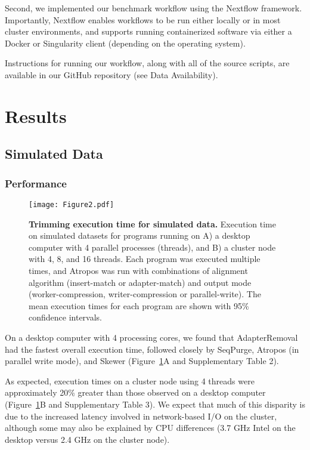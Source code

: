 \documentclass[fleqn,10pt,lineno]{wlpeerj} %
\begin{document}
Second, we implemented our benchmark workflow using the Nextflow \citep{DiTommaso2017Nextflow} framework. Importantly, Nextflow enables workflows to be run either locally or in most cluster environments, and supports running containerized software via either a Docker or Singularity \citep{Kurtzer2016Singularity} client (depending on the operating system).

Instructions for running our workflow, along with all of the source scripts, are available in our GitHub repository (see Data Availability).

\section{Results}\label{results}

\subsection{Simulated Data}

\subsubsection{Performance}

\begin{figure}[!ht]
\centering
\texttt{[image: Figure2.pdf]}
\caption{\textbf{Trimming execution time for simulated data.} Execution time on simulated datasets for programs running on A) a desktop computer with 4 parallel processes (threads), and B) a cluster node with 4, 8, and 16 threads. Each program was executed multiple times, and Atropos was run with combinations of alignment algorithm (insert-match or adapter-match) and output mode (worker-compression, writer-compression or parallel-write). The mean execution times for each program are shown with 95\% confidence intervals.}
\label{fig:simulated-performance}
\end{figure}

On a desktop computer with 4 processing cores, we found that AdapterRemoval had the fastest overall execution time, followed closely by SeqPurge, Atropos (in parallel write mode), and Skewer (Figure~\ref{fig:simulated-performance}A and Supplementary Table 2). 

As expected, execution times on a cluster node using 4 threads were approximately 20\% greater than those observed on a desktop computer (Figure~\ref{fig:simulated-performance}B and Supplementary Table 3). We expect that much of this disparity is due to the increased latency involved in network-based I/O on the cluster, although some may also be explained by CPU differences (3.7 GHz Intel on the desktop versus 2.4 GHz on the cluster node). 
\end{document}
